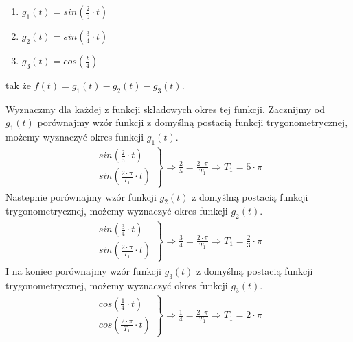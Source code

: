 \begin{task}


\begin{enumerate}
  \item $g_1(t)=sin\left(\frac{2}{5}\cdot t\right)$
  \item $g_2(t)=sin\left(\frac{3}{4}\cdot t\right)$
  \item $g_3(t)=cos\left(\frac{t}{4}\right)$
\end{enumerate}
tak że $f(t) = g_1(t) - g_2(t) - g_3(t)$.

Wyznaczmy dla każdej z funkcji składowych okres tej funkcji. Zacznijmy od $g_1(t)$ porównajmy wzór funkcji z domyślną postacią funkcji trygonometrycznej, możemy wyznaczyć okres funkcji $g_1(t)$. 
\begin{align*}
\left.\begin{matrix}
  sin\left(\frac{2}{5}\cdot t\right)
  \\ 
  sin\left(\frac{2\cdot \pi}{T_1} \cdot t\right)
\end{matrix}\right\}\Rightarrow \frac{2}{5}=\frac{2\cdot \pi}{T_1}\Rightarrow T_1=5\cdot \pi
\end{align*}
Nastepnie porównajmy wzór funkcji $g_2(t)$ z domyślną postacią funkcji trygonometrycznej, możemy wyznaczyć okres funkcji $g_2(t)$. 
\begin{align*}
\left.\begin{matrix}
  sin\left(\frac{3}{4}\cdot t\right)
  \\ 
  sin\left(\frac{2\cdot \pi}{T_1} \cdot t\right)
\end{matrix}\right\}\Rightarrow \frac{3}{4}=\frac{2\cdot \pi}{T_1}\Rightarrow T_1=\frac{2}{3}\cdot \pi
\end{align*}
I na koniec porównajmy wzór funkcji $g_3(t)$ z domyślną postacią funkcji trygonometrycznej, możemy wyznaczyć okres funkcji $g_3(t)$. 
\begin{align*}
 \left.\begin{matrix}
  cos\left(\frac{1}{4}\cdot t\right)
  \\ 
  cos\left(\frac{2\cdot \pi}{T_1} \cdot t\right)
\end{matrix}\right\}\Rightarrow \frac{1}{4}=\frac{2\cdot \pi}{T_1}\Rightarrow T_1=2\cdot \pi
\end{align*}


\end{task}
